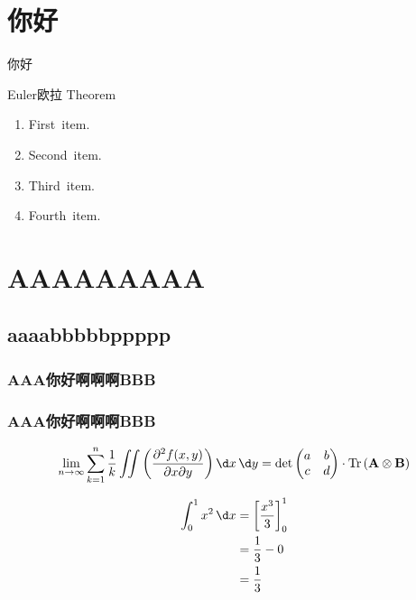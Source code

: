 \documentclass[10pt]{atombook}
\begin{document}
\chapter{你好}
    你好\zhlipsum*[1]
\begin{mybox}[colframe=cyan]{Euler欧拉 Theorem}
    \begin{enumerate}
        \item First~item.
        \item Second~item.
        \item Third~item.
        \item Fourth~item.
    \end{enumerate}
    \zhlipsum*[3]
\end{mybox}
\zhlipsum*[1-3]
    
\chapter{AAAAAAAAA}
\section{aaaabbbbbppppp}
\zhlipsum*[1]

\subsection{AAA你好啊啊啊BBB}
\zhlipsum*[1]

\zhlipsum*[3]

\subsection{AAA你好啊啊啊BBB}

\zhlipsum*[1]
\[ 
\lim_{n \to \infty} \sum_{k=1}^{n} \frac{1}{k} \iint
\left( \frac{\partial^{2} f(x,y)}{\partial x \partial y} \right) \d x \, \d y 
= \det \begin{pmatrix} a & b \\ c & d \end{pmatrix} 
\cdot \operatorname{Tr} \left( \mathbf{A} \otimes \mathbf{B} \right)
\]

\zhlipsum*[2]
\begin{align}
\int_{0}^{1} x^{2} \, \d x 
&= \left[ \frac{x^{3}}{3} \right]_{0}^{1} \\
&= \frac{1}{3} - 0 \\
&= \frac{1}{3}
\end{align}

\zhlipsum*[name=zhufu]
\end{document}
